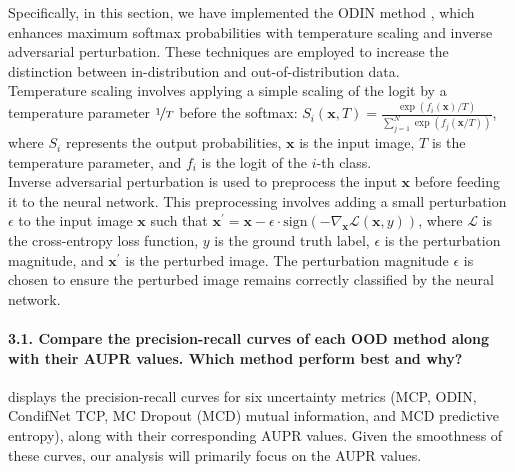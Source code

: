 Specifically, in this section, we have implemented the ODIN method \citep{ODIN}, which enhances maximum softmax probabilities with temperature scaling and inverse adversarial perturbation. These techniques are employed to increase the distinction between in-distribution and out-of-distribution data.\\
Temperature scaling involves applying a simple scaling of the logit by a temperature parameter $ \nicefrac{1}{T} $ before the softmax: $ S_i(\boldsymbol{x}, T) = \frac{\exp (f_i(\boldsymbol{x}) / T)}{\sum_{j=1}^{N} \exp (f_j(\boldsymbol{x} / T))} $, where $ S_i $ represents the output probabilities, $ \boldsymbol{x} $ is the input image, $ T $ is the temperature parameter, and $ f_i $ is the logit of the $ i $-th class.\\
Inverse adversarial perturbation is used to preprocess the input $ \boldsymbol{x} $ before feeding it to the neural network. This preprocessing involves adding a small perturbation $ \epsilon $ to the input image $ \boldsymbol{x} $ such that $ \boldsymbol{x}^\prime = \boldsymbol{x} - \epsilon \cdot \text{sign}(-\nabla_{\boldsymbol{x}} \mathcal{L}(\boldsymbol{x}, y)) $, where $ \mathcal{L} $ is the cross-entropy loss function, $ y $ is the ground truth label, $ \epsilon $ is the perturbation magnitude, and $ \boldsymbol{x}^\prime $ is the perturbed image. The perturbation magnitude $ \epsilon $ is chosen to ensure the perturbed image remains correctly classified by the neural network.

\paragraph*{3.1. Compare the precision-recall curves of each OOD method along with their AUPR values. Which method perform best and why?}
 displays the precision-recall curves for six uncertainty metrics (MCP, ODIN, CondifNet TCP, MC Dropout (MCD) mutual information, and MCD predictive entropy), along with their corresponding AUPR values. Given the smoothness of these curves, our analysis will primarily focus on the AUPR values.

